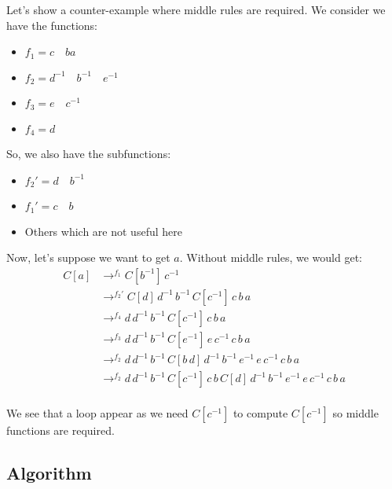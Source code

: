\documentclass[10pt,a4paper,draft]{article}
\begin{document}
Let's show a counter-example where middle rules are required. We consider we have the functions:
\begin{itemize}
\item $f_1 = c \quad b a$
\item $f_2 = d^{-1} \quad b^{-1} \quad e^{-1}$
\item $f_3 = e \quad c^{-1}$
\item $f_4 = d$
\end{itemize}
So, we also have the subfunctions:
\begin{itemize}
\item $f_2' = d \quad b^{-1}$
\item $f_1' = c \quad b$
\item Others which are not useful here
\end{itemize}
Now, let's suppose we want to get $a$. Without middle rules, we would get:
\begin{equation}
\begin{split}
C[a] & \rightarrow^{f_1} C[b^{-1}] \, c^{-1}\\
     & \rightarrow^{f_2'} C[d] \, d^{-1} \,  b^{-1} \, C[c^{-1}] \, c \, b \, a\\
     & \rightarrow^{f_4} d \, d^{-1} \,  b^{-1} \, C[c^{-1}] \, c \, b \, a\\
     & \rightarrow^{f_3} d \, d^{-1} \,  b^{-1} \, C[e^{-1}] \, e \, c^{-1} \, c \, b \, a\\
     & \rightarrow^{f_2} d \, d^{-1} \,  b^{-1} \, C[b \, d] \, d^{-1} \, b^{-1} \, e^{-1} \, e \, c^{-1} \, c \, b \, a\\
     & \rightarrow^{f_2} d \, d^{-1} \,  b^{-1} \, C[c^{-1}] \, c \, b \, C[d] \, d^{-1} \, b^{-1} \, e^{-1} \, e \, c^{-1} \, c \, b \, a\\
\end{split}
\end{equation}

We see that a loop appear as we need $C[c^{-1}]$ to compute $C[c^{-1}]$ so middle functions are required.

\subsection{Algorithm}
\end{document}
